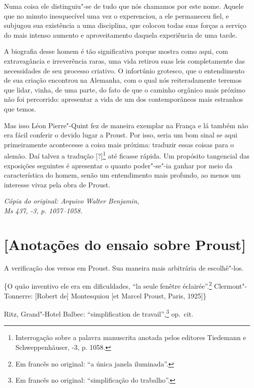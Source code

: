 Numa coisa ele distinguiu"-se de tudo que nós chamamos por este nome.
Aquele que no minuto inesquecível uma vez o experenciou, a ele
permaneceu fiel, e subjugou sua existência a uma disciplina, que colocou
todas suas forças a serviço do mais intenso aumento e aproveitamento
daquela experiência de uma tarde.

A biografia desse homem é tão significativa porque mostra como aqui, com
extravagância e irreverência raras, uma vida retirou suas leis
completamente das necessidades de seu processo criativo. O infortúnio
grotesco, que o entendimento de
sua criação encontrou na Alemanha, com o qual nós reiteradamente
teremos que lidar, vinha, de uma parte, do fato de que o caminho orgânico
mais próximo não foi percorrido: apresentar a vida de um dos
contemporâneos mais estranhos que temos.

Mas isso Léon Pierre"-Quint fez de maneira exemplar na França e lá também
não era fácil conferir o devido lugar a Proust. Por isso, seria um bom
sinal se aqui primeiramente acontecesse a coisa mais próxima: traduzir
essas coisas para o alemão. Daí talvez a tradução {[}?{]}\footnote{Interrogação sobre a palavra manuscrita anotada pelos editores
  Tiedemann e Schweppenhäuser, -3, p. 1058. \versal{[N.~T.]}} até ficasse
rápida. Um propósito tangencial das exposições seguintes é apresentar o
quanto poder"-se"-ia ganhar por meio da característica do homem, senão um
entendimento mais profundo, ao menos um interesse vivaz pela obra de
Proust.


\begin{flushright}
\emph{\footnotesize{Cópia do original: Arquivo Walter Benjamin,\\ Ms 437, -3, p. 1057--1058.}}
\end{flushright}

\pagebreak

\section{{[}Anotações do ensaio sobre Proust{]}}

A verificação dos versos em Proust. Sua maneira mais arbitrária de
escolhê"-los.

\{O quão inventivo ele era em dificuldades, ``la seule fenêtre
éclairée''.\footnote{Em francês no original: ``a única janela iluminada''. \versal{[N.~T.]}}
Clermont"-Tonnerre: {[}Robert de{]} Montesquiou {[}et Marcel Proust,
Paris, 1925{]}\}

Ritz, Grand"-Hotel Balbec: ``simplification de travail'',\footnote{Em francês no original: ``simplificação do trabalho''. \versal{[N.~T.]}} op.~cit.

